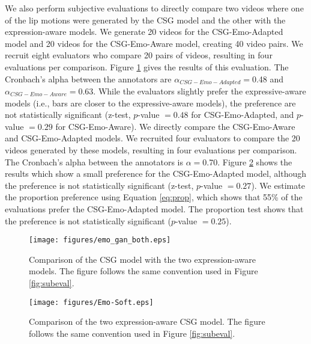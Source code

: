 \documentclass[10pt,journal,compsoc]{IEEEtran}
\begin{document}
We also perform subjective evaluations to directly compare two videos where one of the lip motions were generated by the CSG model and the other with the expression-aware models. We generate 20 videos for the CSG-Emo-Adapted model and 20 videos for the CSG-Emo-Aware model, creating 40 video pairs. We recruit eight evaluators who compare 20 pairs of videos, resulting in four evaluations per comparison. Figure \ref{fig:subevalgemo} gives the results of this evaluation. The Cronbach's alpha between the annotators are $\alpha_\mathit{CSG-Emo-Adapted}=$0.48 and $\alpha_\mathit{CSG-Emo-Aware}=$0.63. While the evaluators slightly prefer the expressive-aware models (i.e., bars are closer to the expressive-aware models), the preference are not statistically significant (z-test, $p$-value $=0.48$ for CSG-Emo-Adapted, and $p$-value $=0.29$ for CSG-Emo-Aware). We directly compare the CSG-Emo-Aware and CSG-Emo-Adapted models. We recruited four evaluators to compare the 20 videos generated by these models,  resulting in four evaluations per comparison. The Cronbach's alpha between the annotators is $\alpha=$0.70. Figure \ref{fig:subevalemo} shows the results which show a small preference for the CSG-Emo-Adapted model, although the preference is not statistically significant (z-test, $p$-value $=0.27$). We estimate the proportion preference using Equation \ref{eq:prop}, which shows that 55\% of the evaluations prefer the CSG-Emo-Adapted model. The proportion test shows that the preference is not statistically significant ($p$-value $=0.25$).   


\begin{figure}
	\centering
	\texttt{[image: figures/emo\_gan\_both.eps]}
	\caption{Comparison of the CSG model with the two expression-aware models. The figure follows the same convention used in Figure \ref{fig:subeval}.}
	\label{fig:subevalgemo}
\end{figure}

\begin{figure}
	\centering
	\texttt{[image: figures/Emo-Soft.eps]}
	\caption{Comparison of the two expression-aware CSG model. The figure follows the same convention used in Figure \ref{fig:subeval}.}
	\label{fig:subevalemo}
\end{figure}
\end{document}
